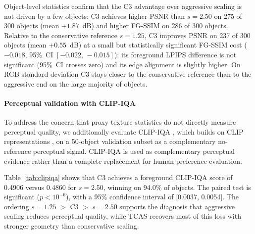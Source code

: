 \documentclass[times,twocolumn,final]{elsarticle}
\begin{document}
Object-level statistics confirm that the C3 advantage over aggressive scaling is not driven by a few objects: C3 achieves higher PSNR than $s = 2.50$ on 275 of 300 objects (mean $+1.87$~dB) and higher FG-SSIM on 286 of 300 objects. Relative to the conservative reference $s = 1.25$, C3 improves PSNR on 237 of 300 objects (mean $+0.55$~dB) at a small but statistically significant FG-SSIM cost ($-0.018$, 95\%~CI $[-0.022,\,-0.015]$); its foreground LPIPS difference is not significant (95\%~CI crosses zero) and its edge alignment is slightly higher. On RGB standard deviation C3 stays closer to the conservative reference than to the aggressive end on the large majority of objects.

\paragraph{Perceptual validation with CLIP-IQA}
To address the concern that proxy texture statistics do not directly measure perceptual quality, we additionally evaluate CLIP-IQA \cite{wang2023clipiqa}, which builds on CLIP representations \cite{radford2021clip}, on a 50-object validation subset as a complementary no-reference perceptual signal. CLIP-IQA is used as complementary perceptual evidence rather than a complete replacement for human preference evaluation.

\begin{table}[t]
\centering
\caption{CLIP-IQA perceptual validation on 50 validation objects. Scores are reported for foreground regions and full rendered views. Higher is better.}
\label{tab:clipiqa}
\end{table}

Table~\ref{tab:clipiqa} shows that C3 achieves a foreground CLIP-IQA score of 0.4906 versus 0.4860 for $s = 2.50$, winning on 94.0\% of objects. The paired test is significant ($p < 10^{-6}$), with a 95\% confidence interval of [0.0037, 0.0054]. The ordering $s = 1.25$ $>$ C3 $>$ $s = 2.50$ supports the diagnosis that aggressive scaling reduces perceptual quality, while TCAS recovers most of this loss with stronger geometry than conservative scaling.
\end{document}
